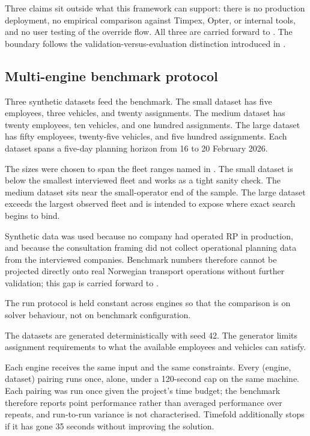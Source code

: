 Three claims sit outside what this framework can support: there is no production deployment, no empirical comparison against Timpex, Opter, or internal tools, and no user testing of the override flow. All three are carried forward to . The boundary follows the validation-versus-evaluation distinction introduced in .

\subsection{Multi-engine benchmark protocol}
\label{sec:eval-benchmark}

Three synthetic datasets feed the benchmark. The small dataset has five employees, three vehicles, and twenty assignments. The medium dataset has twenty employees, ten vehicles, and one hundred assignments. The large dataset has fifty employees, twenty-five vehicles, and five hundred assignments. Each dataset spans a five-day planning horizon from 16 to 20 February 2026.

The sizes were chosen to span the fleet ranges named in . The small dataset is below the smallest interviewed fleet and works as a tight sanity check. The medium dataset sits near the small-operator end of the sample. The large dataset exceeds the largest observed fleet and is intended to expose where exact search begins to bind.

Synthetic data was used because no company had operated RP in production, and because the consultation framing did not collect operational planning data from the interviewed companies. Benchmark numbers therefore cannot be projected directly onto real Norwegian transport operations without further validation; this gap is carried forward to .

The run protocol is held constant across engines so that the comparison is on solver behaviour, not on benchmark configuration.

The datasets are generated deterministically with seed 42. The generator limits assignment requirements to what the available employees and vehicles can satisfy.

Each engine receives the same input and the same constraints. Every (engine, dataset) pairing runs once, alone, under a 120-second cap on the same machine. Each pairing was run once given the project's time budget; the benchmark therefore reports point performance rather than averaged performance over repeats, and run-to-run variance is not characterised. Timefold additionally stops if it has gone 35 seconds without improving the solution.

